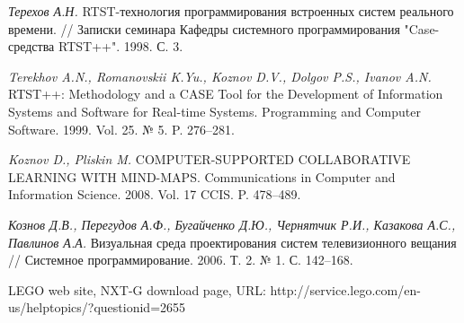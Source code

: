 \documentclass[a4paper]{article}
\begin{document}
\begin{thebibliography}{9001}
   \emph{Терехов А.Н.}  RTST-технология программирования встроенных систем реального времени. // Записки семинара Кафедры системного программирования "Case-средства RTST++". 1998. С. 3.

   \emph{Terekhov A.N., Romanovskii K.Yu., Koznov D.V., Dolgov P.S., Ivanov A.N.} RTST++: Methodology and a CASE Tool for the Development of Information Systems and Software for Real-time Systems. Programming and Computer Software. 1999. Vol. 25. № 5. P. 276--281. 

   \emph{Koznov D., Pliskin M.} COMPUTER-SUPPORTED COLLABORATIVE LEARNING WITH MIND-MAPS. Communications in Computer and Information Science. 2008. Vol. 17 CCIS. P. 478--489.

   \emph{Кознов Д.В., Перегудов А.Ф., Бугайченко Д.Ю., Чернятчик Р.И., Казакова А.С., Павлинов А.А.} Визуальная среда проектирования систем телевизионного вещания // Системное программирование. 2006. Т. 2. № 1. С. 142--168.

   LEGO web site, NXT-G download page, URL: http://service.lego.com/en-us/helptopics/?questionid=2655
	
\end{thebibliography}
\end{document}
